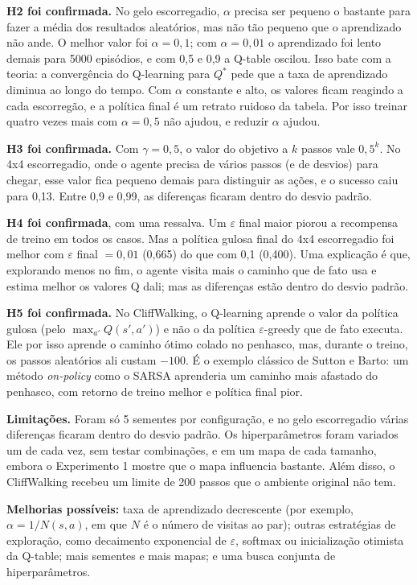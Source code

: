 \documentclass[11pt,a4paper]{article}
\begin{document}
\textbf{H2 foi confirmada.} No gelo escorregadio, $\alpha$ precisa ser pequeno o bastante para fazer a média dos
resultados aleatórios, mas não tão pequeno que o aprendizado não ande. O melhor valor foi $\alpha = 0{,}1$; com
$\alpha = 0{,}01$ o aprendizado foi lento demais para 5000 episódios, e com 0,5 e 0,9 a Q-table oscilou. Isso bate
com a teoria: a convergência do Q-learning para $Q^*$ pede que a taxa de aprendizado diminua ao longo do tempo. Com
$\alpha$ constante e alto, os valores ficam reagindo a cada escorregão, e a política final é um retrato ruidoso da
tabela. Por isso treinar quatro vezes mais com $\alpha = 0{,}5$ não ajudou, e reduzir $\alpha$ ajudou.

\textbf{H3 foi confirmada.} Com $\gamma = 0{,}5$, o valor do objetivo a $k$ passos vale $0{,}5^k$. No 4x4
escorregadio, onde o agente precisa de vários passos (e de desvios) para chegar, esse valor fica pequeno demais para
distinguir as ações, e o sucesso caiu para 0,13. Entre 0,9 e 0,99, as diferenças ficaram dentro do desvio padrão.

\textbf{H4 foi confirmada}, com uma ressalva. Um $\varepsilon$ final maior piorou a recompensa de treino em todos os
casos. Mas a política gulosa final do 4x4 escorregadio foi melhor com $\varepsilon$ final $= 0{,}01$ (0,665) do que com
0,1 (0,400). Uma explicação é que, explorando menos no fim, o agente visita mais o caminho que de fato usa e estima
melhor os valores Q dali; mas as diferenças estão dentro do desvio padrão.

\textbf{H5 foi confirmada.} No CliffWalking, o Q-learning aprende o valor da política gulosa (pelo
$\max_{a'} Q(s',a')$) e não o da política $\varepsilon$-greedy que de fato executa. Ele por isso aprende o caminho
ótimo colado no penhasco, mas, durante o treino, os passos aleatórios ali custam $-100$. É o exemplo clássico de
Sutton e Barto: um método \emph{on-policy} como o SARSA aprenderia um caminho mais afastado do penhasco, com retorno
de treino melhor e política final pior.

\textbf{Limitações.} Foram só 5 sementes por configuração, e no gelo escorregadio várias diferenças ficaram
dentro do desvio padrão. Os hiperparâmetros foram variados um de cada vez, sem testar combinações, e em um mapa de cada
tamanho, embora o Experimento 1 mostre que o mapa influencia bastante. Além disso, o CliffWalking recebeu um limite de
200 passos que o ambiente original não tem.

\textbf{Melhorias possíveis:} taxa de aprendizado decrescente (por exemplo, $\alpha = 1/N(s,a)$, em que $N$ é o número
de visitas ao par); outras estratégias de exploração, como decaimento exponencial de $\varepsilon$, softmax ou
inicialização otimista da Q-table; mais sementes e mais mapas; e uma busca conjunta de hiperparâmetros.
\end{document}
